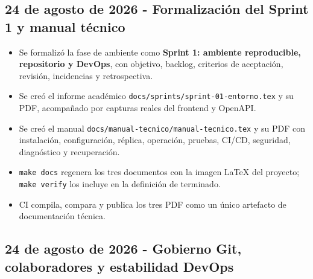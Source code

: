 \documentclass[11pt,letterpaper]{article}
\newcommand{\file}[1]{\texttt{#1}}
\begin{document}
\subsection{24 de agosto de 2026 - Formalización del Sprint 1 y manual técnico}

\begin{itemize}
  \item Se formalizó la fase de ambiente como \textbf{Sprint 1: ambiente reproducible, repositorio y DevOps}, con objetivo, backlog, criterios de aceptación, revisión, incidencias y retrospectiva.
  \item Se creó el informe académico \file{docs/sprints/sprint-01-entorno.tex} y su PDF, acompañado por capturas reales del frontend y OpenAPI.
  \item Se creó el manual \file{docs/manual-tecnico/manual-tecnico.tex} y su PDF con instalación, configuración, réplica, operación, pruebas, CI/CD, seguridad, diagnóstico y recuperación.
  \item \file{make docs} regenera los tres documentos con la imagen LaTeX del proyecto; \file{make verify} los incluye en la definición de terminado.
  \item CI compila, compara y publica los tres PDF como un único artefacto de documentación técnica.
\end{itemize}

\subsection{24 de agosto de 2026 - Gobierno Git, colaboradores y estabilidad DevOps}
\end{document}
